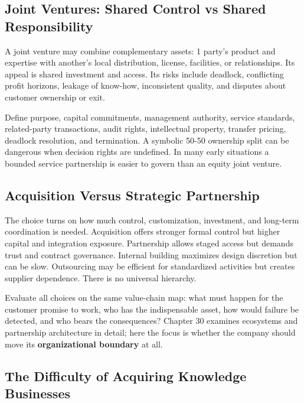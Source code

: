 \subsection{Joint Ventures: Shared Control vs Shared Responsibility}
\label{sec:joint_ventures_shared_control_responsibility}

A joint venture may combine complementary assets: 1 party's product and expertise with another's local distribution, license, facilities, or relationships. Its appeal is shared investment and access. Its risks include deadlock, conflicting profit horizons, leakage of know-how, inconsistent quality, and disputes about customer ownership or exit.

Define purpose, capital commitments, management authority, service standards, related-party transactions, audit rights, intellectual property, transfer pricing, deadlock resolution, and termination. A symbolic 50-50 ownership split can be dangerous when decision rights are undefined. In many early situations a bounded service partnership is easier to govern than an equity joint venture.

\subsection{Acquisition Versus Strategic Partnership}
\label{sec:acquisition_vs_strategic_partnership}

The choice turns on how much control, customization, investment, and long-term coordination is needed. Acquisition offers stronger formal control but higher capital and integration exposure. Partnership allows staged access but demands trust and contract governance. Internal building maximizes design discretion but can be slow. Outsourcing may be efficient for standardized activities but creates supplier dependence. There is no universal hierarchy.

Evaluate all choices on the same value-chain map: what must happen for the customer promise to work, who has the indispensable asset, how would failure be detected, and who bears the consequences? Chapter 30 examines ecosystems and partnership architecture in detail; here the focus is whether the company should move its \textbf{organizational boundary} at all.

\subsection{The Difficulty of Acquiring Knowledge Businesses}
\label{sec:special_difficulty_acquiring_knowledge_businesses}

